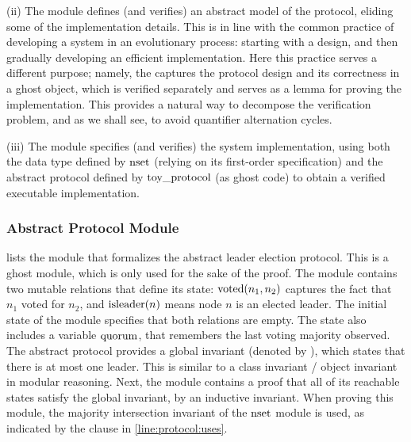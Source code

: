 (ii) The {\mtoyprotocol} module defines (and verifies) an abstract model of the protocol, eliding some of the
implementation details.
This is in line with the common practice of developing a system in an evolutionary process:
starting with a design, and then gradually developing an efficient implementation.
Here this practice serves a different purpose; namely, the {\mtoyprotocol} captures the protocol design and its correctness in a ghost object,
which is verified separately and serves as a lemma for proving the implementation.
This provides a natural way to decompose the verification problem,
and as we shall see, to avoid quantifier alternation cycles.

(iii) The {\mtoysystem} module specifies (and verifies) the system implementation,
using both the data type defined by ${\text{nset}}$ (relying on its first-order specification) and the
abstract protocol defined by ${\text{toy\_protocol}}$ (as ghost code) to obtain a verified executable implementation.


\subsubsection{Abstract Protocol Module}
\label{sec:toyprotocol}



 lists the module that formalizes the
abstract leader election protocol.
This is a ghost module, which is only used for the sake of the proof.
The module contains two mutable relations that define its state:
${\text{voted}}(n_1,n_2)$ captures the fact that $n_1$ voted for $n_2$, and
${\text{isleader}}(n)$ means node $n$ is an elected leader. The initial state
of the module specifies that both relations are empty. The state also
includes a variable ${\text{quorum}}$, that remembers the last voting
majority observed. The abstract protocol provides a global invariant
(denoted by ), which states that there is at most
one leader. This is similar to a class invariant / object invariant in
modular reasoning. Next, the module contains a proof that all of its
reachable states satisfy the global invariant, by an inductive
invariant. When proving this module, the majority intersection
invariant of the ${\text{nset}}$ module is used, as indicated by the
 clause in \cref{line:protocol:uses}.

